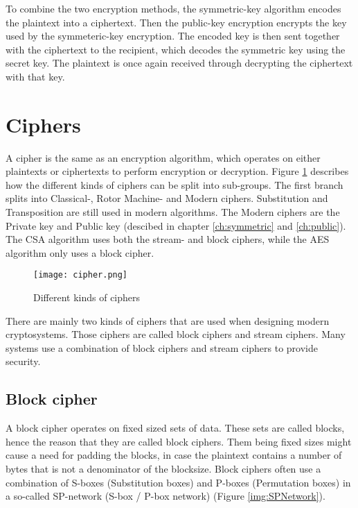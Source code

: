 To combine the two encryption methods, the symmetric-key algorithm 
encodes the plaintext into a ciphertext. Then the public-key encryption 
encrypts the key used by the symmeteric-key encryption. The encoded key 
is then sent together with the ciphertext to the recipient, which 
decodes the symmetric key using the secret key. The plaintext is once 
again received through decrypting the ciphertext with that key.

\section{Ciphers}
A cipher is the same as an encryption algorithm, which operates on 
either plaintexts or ciphertexts to perform encryption or decryption. 
Figure \ref{img:ciphers} describes how the different kinds of ciphers 
can be split into sub-groups. The first branch splits into Classical-, 
Rotor Machine- and Modern ciphers. Substitution and Transposition are 
still used in modern algorithms. The Modern ciphers are the Private 
key and Public key (descibed in chapter \ref{ch:symmetric} and 
\ref{ch:public}). The CSA algorithm uses both the stream- and block 
ciphers, while the AES algorithm only uses a block cipher.

\begin{figure}
  \texttt{[image: cipher.png]}
  \caption{Different kinds of ciphers \citep{CipherTax:2013}}
  \label{img:ciphers}
\end{figure}

There are mainly two kinds of ciphers that are used when designing 
modern cryptosystems. Those ciphers are called block ciphers and 
stream ciphers. Many systems use a combination of block ciphers and 
stream ciphers to provide security. 


\subsection{Block cipher}\label{sec:BlockCipher}
A block cipher operates on fixed sized sets of data. These sets are 
called blocks, hence the reason that they are called block ciphers. 
Them being fixed sizes might cause a need for padding the blocks, in 
case the plaintext contains a number of bytes that is not a denominator
of the blocksize. Block ciphers often use a combination of S-boxes 
(Substitution boxes) and P-boxes (Permutation boxes) in a so-called 
SP-network (S-box / P-box network) (Figure \ref{img:SPNetwork}).

